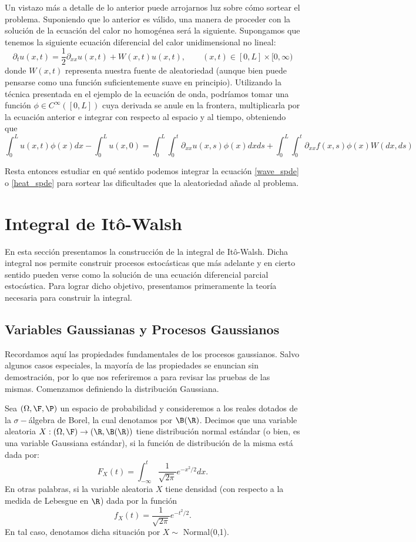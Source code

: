Un vistazo más a detalle de lo anterior puede arrojarnos luz sobre cómo sortear el problema. Suponiendo que lo anterior es válido, una manera de proceder con la solución de la ecuación del calor no homogénea será la siguiente. Supongamos que tenemos la siguiente ecuación diferencial del calor unidimensional no lineal:
\[
\partial_tu(x,t)=\frac{1}{2}\partial_{xx}u(x,t)+W(x,t)u(x,t), \qquad (x,t)\in [0,L]\times [0,\infty) 
\]
donde $W(x,t)$ representa nuestra fuente de aleatoriedad (aunque bien puede pensarse como una función suficientemente suave en principio). Utilizando la técnica presentada en el ejemplo de la ecuación de onda, podríamos tomar una función $\phi \in C^{\infty}([0,L])$ cuya derivada se anule en la frontera, multiplicarla por la ecuación anterior e integrar con respecto al espacio y al tiempo, obteniendo que 
\[
\int_{0}^{L}u(x,t)\phi(x)dx-\int_{0}^{L}u(x,0)=\int_{0}^{L}\int_{0}^{t}\partial_{xx}u(x,s)\phi(x)dx ds+\int_{0}^{L}\int_{0}^{t}\partial_{xx}f(x,s)\phi(x)W(dx,ds)
\]
 
Resta entonces estudiar en qué sentido podemos integrar la ecuación \eqref{wave_spde} o \eqref{heat_spde} para sortear las dificultades que la aleatoriedad añade al problema.


\section{Integral de Itô-Walsh}
En esta sección presentamos la construcción de la integral de Itô-Walsh. Dicha integral nos permite construir procesos estocásticas que más adelante y en cierto sentido pueden verse como la solución de una ecuación diferencial parcial estocástica. Para lograr dicho objetivo, presentamos primeramente la teoría necesaria para construir la integral.
\subsection{Variables Gaussianas y Procesos Gaussianos}
Recordamos aquí las propiedades fundamentales de los procesos gaussianos. Salvo algunos casos especiales, la mayoría de las propiedades se enuncian sin demostración, por lo que nos referiremos a \cite{gall2016brownian} para revisar las pruebas de las mismas. Comenzamos definiendo la distribución Gaussiana.

\begin{dfn}
Sea $(\Omega, \F, \P)$ un espacio de probabilidad y consideremos a los reales dotados de la $\sigma-$álgebra de Borel, la cual denotamos por $\B(\R)$. Decimos que una variable aleatoria $X:(\Omega, \F)\to (\R,\B(\R))$ tiene distribución normal estándar (o bien, es una variable Gaussiana estándar), si la función de distribución de la misma está dada por: 
\[
F_X(t)=\int_{-\infty}^{t}\frac{1}{\sqrt{2\pi}}e^{-x^2/2}dx.    
\]
En otras palabras, si la variable aleatoria $X$ tiene densidad (con respecto a la medida de Lebesgue en $\R$) dada por la función 
\[
f_X(t)=\frac{1}{\sqrt{2\pi}}e^{-t^2/2}.
\]
En tal caso, denotamos dicha situación por $X\sim$ Normal(0,1).
\end{dfn}

